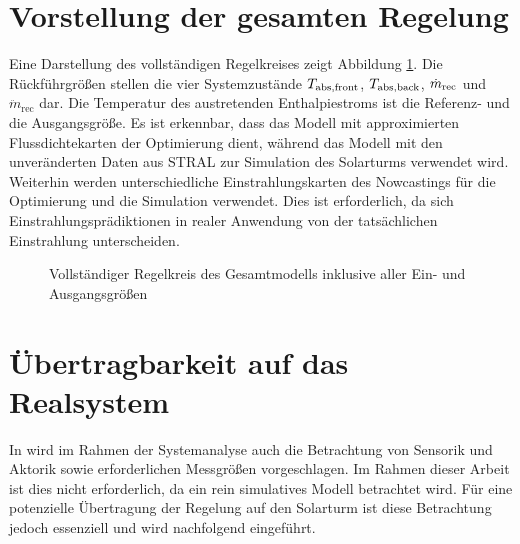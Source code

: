 \section{Vorstellung der gesamten Regelung} \label{sec_VorstelungRegelung}
Eine Darstellung des vollständigen Regelkreises zeigt Abbildung \ref{fig_Regelkreisvollst}.
Die Rückführgrößen stellen die vier Systemzustände $T_{\mathrm{abs,front}}$, $T_{\mathrm{abs,back}}$, $\dot{m}_{\mathrm{rec}}$ und $\ddot{m}_{\mathrm{rec}}$ dar.
Die Temperatur des austretenden Enthalpiestroms ist die Referenz- und die Ausgangsgröße.
Es ist erkennbar, dass das Modell mit approximierten Flussdichtekarten der Optimierung dient, während das Modell mit den unveränderten Daten aus STRAL zur Simulation des Solarturms verwendet wird.
Weiterhin werden unterschiedliche Einstrahlungskarten des Nowcastings für die Optimierung und die Simulation verwendet.
Dies ist erforderlich, da sich Einstrahlungsprädiktionen in realer Anwendung von der tatsächlichen Einstrahlung unterscheiden.

\begin{figure}[h!]
\centering
\setlength{\fboxsep}{1pt}
\setlength{\fboxrule}{1pt}
\caption[Vollständiger Regelkreis des Gesamtmodells inklusive aller Ein- und Ausgangsgrößen]{Vollständiger Regelkreis des Gesamtmodells inklusive aller Ein- und Ausgangsgrößen}
\label{fig_Regelkreisvollst}
\end{figure}


\section{Übertragbarkeit auf das Realsystem} \label{sec_RealsystemRegelung}
In \cite[S.1]{Skogestad} wird im Rahmen der Systemanalyse auch die Betrachtung von Sensorik und Aktorik sowie erforderlichen Messgrößen vorgeschlagen.
Im Rahmen dieser Arbeit ist dies nicht erforderlich, da ein rein simulatives Modell betrachtet wird.
Für eine potenzielle Übertragung der Regelung auf den Solarturm ist diese Betrachtung jedoch essenziell und wird nachfolgend eingeführt.

